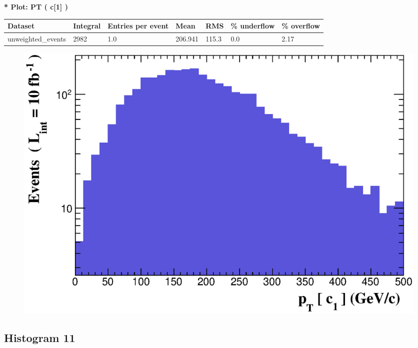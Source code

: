 \documentclass[a4paper, 10pt]{article}
\begin{document}
\textbf{* Plot: PT ( c[1] ) }\\
   \begin{table}[H]
  \begin{center}
    \begin{tabular}{|m{23.0mm}|m{23.0mm}|m{18.0mm}|m{19.0mm}|m{19.0mm}|m{19.0mm}|m{19.0mm}|}
      \hline
      {\cellcolor{yellow}         Dataset}& {\cellcolor{yellow}         Integral}& {\cellcolor{yellow}         Entries per event}& {\cellcolor{yellow}         Mean}& {\cellcolor{yellow}         RMS}& {\cellcolor{yellow}         \% underflow}& {\cellcolor{yellow}         \% overflow}\\
      \hline
      {\cellcolor{white}         unweighted\_events}& {\cellcolor{white}         2982}& {\cellcolor{white}         1.0}& {\cellcolor{white}         206.941}& {\cellcolor{white}         115.3}& {\cellcolor{green}         0.0}& {\cellcolor{green}         2.17}\\
\hline
    \end{tabular}
  \end{center}
\end{table}

\begin{figure}[H]
  \begin{center}
    \includegraphics[scale=0.45]{selection_9.eps}\\
\caption{   }
  \end{center}
\end{figure}
      \newpage
\subsection{ Histogram 11}
\end{document}
